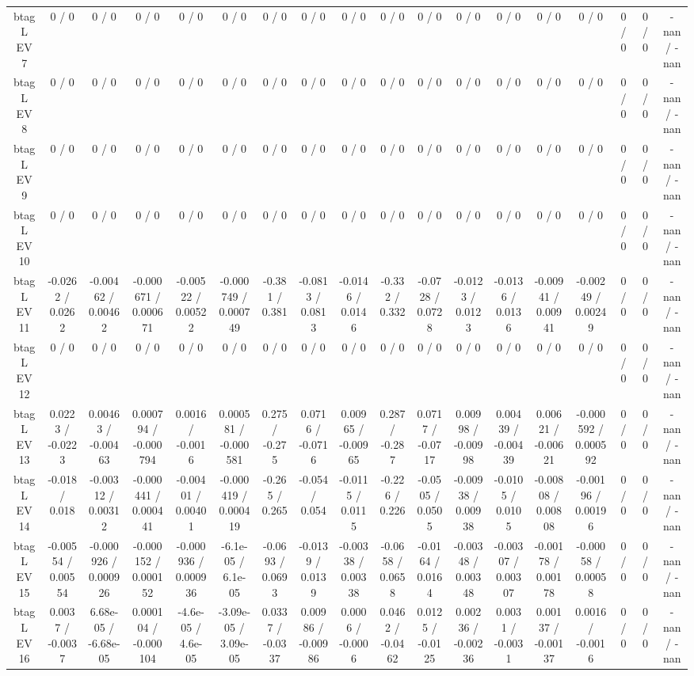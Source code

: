 \documentclass[10pt]{article}
\begin{document}
\begin{table}[htbp]
\begin{center}
\begin{tabular}{|c|c|c|c|c|c|c|c|c|c|c|c|c|c|c|c|c|c|}
  btag L EV 7 & 0 / 0 & 0 / 0 & 0 / 0 & 0 / 0 & 0 / 0 & 0 / 0 & 0 / 0 & 0 / 0 & 0 / 0 & 0 / 0 & 0 / 0 & 0 / 0 & 0 / 0 & 0 / 0 & 0 / 0 & 0 / 0 & -nan / -nan \\ 
  btag L EV 8 & 0 / 0 & 0 / 0 & 0 / 0 & 0 / 0 & 0 / 0 & 0 / 0 & 0 / 0 & 0 / 0 & 0 / 0 & 0 / 0 & 0 / 0 & 0 / 0 & 0 / 0 & 0 / 0 & 0 / 0 & 0 / 0 & -nan / -nan \\ 
  btag L EV 9 & 0 / 0 & 0 / 0 & 0 / 0 & 0 / 0 & 0 / 0 & 0 / 0 & 0 / 0 & 0 / 0 & 0 / 0 & 0 / 0 & 0 / 0 & 0 / 0 & 0 / 0 & 0 / 0 & 0 / 0 & 0 / 0 & -nan / -nan \\ 
  btag L EV 10 & 0 / 0 & 0 / 0 & 0 / 0 & 0 / 0 & 0 / 0 & 0 / 0 & 0 / 0 & 0 / 0 & 0 / 0 & 0 / 0 & 0 / 0 & 0 / 0 & 0 / 0 & 0 / 0 & 0 / 0 & 0 / 0 & -nan / -nan \\ 
  btag L EV 11 & -0.0262 / 0.0262 & -0.00462 / 0.00462 & -0.000671 / 0.000671 & -0.00522 / 0.00522 & -0.000749 / 0.000749 & -0.381 / 0.381 & -0.0813 / 0.0813 & -0.0146 / 0.0146 & -0.332 / 0.332 & -0.0728 / 0.0728 & -0.0123 / 0.0123 & -0.0136 / 0.0136 & -0.00941 / 0.00941 & -0.00249 / 0.00249 & 0 / 0 & 0 / 0 & -nan / -nan \\ 
  btag L EV 12 & 0 / 0 & 0 / 0 & 0 / 0 & 0 / 0 & 0 / 0 & 0 / 0 & 0 / 0 & 0 / 0 & 0 / 0 & 0 / 0 & 0 / 0 & 0 / 0 & 0 / 0 & 0 / 0 & 0 / 0 & 0 / 0 & -nan / -nan \\ 
  btag L EV 13 & 0.0223 / -0.0223 & 0.00463 / -0.00463 & 0.000794 / -0.000794 & 0.0016 / -0.0016 & 0.000581 / -0.000581 & 0.275 / -0.275 & 0.0716 / -0.0716 & 0.00965 / -0.00965 & 0.287 / -0.287 & 0.0717 / -0.0717 & 0.00998 / -0.00998 & 0.00439 / -0.00439 & 0.00621 / -0.00621 & -0.000592 / 0.000592 & 0 / 0 & 0 / 0 & -nan / -nan \\ 
  btag L EV 14 & -0.018 / 0.018 & -0.00312 / 0.00312 & -0.000441 / 0.000441 & -0.00401 / 0.00401 & -0.000419 / 0.000419 & -0.265 / 0.265 & -0.054 / 0.054 & -0.0115 / 0.0115 & -0.226 / 0.226 & -0.0505 / 0.0505 & -0.00938 / 0.00938 & -0.0105 / 0.0105 & -0.00808 / 0.00808 & -0.00196 / 0.00196 & 0 / 0 & 0 / 0 & -nan / -nan \\ 
  btag L EV 15 & -0.00554 / 0.00554 & -0.000926 / 0.000926 & -0.000152 / 0.000152 & -0.000936 / 0.000936 & -6.1e-05 / 6.1e-05 & -0.0693 / 0.0693 & -0.0139 / 0.0139 & -0.00338 / 0.00338 & -0.0658 / 0.0658 & -0.0164 / 0.0164 & -0.00348 / 0.00348 & -0.00307 / 0.00307 & -0.00178 / 0.00178 & -0.00058 / 0.00058 & 0 / 0 & 0 / 0 & -nan / -nan \\ 
  btag L EV 16 & 0.0037 / -0.0037 & 6.68e-05 / -6.68e-05 & 0.000104 / -0.000104 & -4.6e-05 / 4.6e-05 & -3.09e-05 / 3.09e-05 & 0.0337 / -0.0337 & 0.00986 / -0.00986 & 0.0006 / -0.0006 & 0.0462 / -0.0462 & 0.0125 / -0.0125 & 0.00236 / -0.00236 & 0.0031 / -0.0031 & 0.00137 / -0.00137 & 0.0016 / -0.0016 & 0 / 0 & 0 / 0 & -nan / -nan \\ 

\end{tabular}
\end{center}
\end{table}
\end{document}
